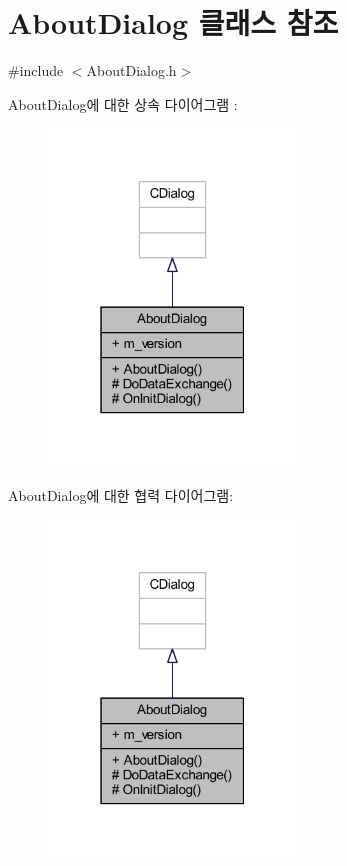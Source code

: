 \hypertarget{class_about_dialog}{}\section{About\+Dialog 클래스 참조}
\label{class_about_dialog}


{\ttfamily \#include $<$About\+Dialog.\+h$>$}



About\+Dialog에 대한 상속 다이어그램 \+: \nopagebreak
\begin{figure}[H]
\begin{center}
\leavevmode
\includegraphics[width=187pt]{class_about_dialog__inherit__graph}
\end{center}
\end{figure}


About\+Dialog에 대한 협력 다이어그램\+:\nopagebreak
\begin{figure}[H]
\begin{center}
\leavevmode
\includegraphics[width=187pt]{class_about_dialog__coll__graph}
\end{center}
\end{figure}
